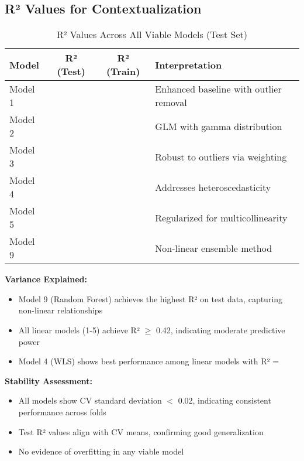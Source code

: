 \subsection{R² Values for Contextualization}

\begin{table}[h!]
\centering
\caption{R² Values Across All Viable Models (Test Set)}
\label{tab:r2_comparison}
\begin{tabular}{lccl}
\toprule
\textbf{Model} & \textbf{R² (Test)} & \textbf{R² (Train)} & \textbf{Interpretation} \\
\midrule
Model 1 & \ModelOneRSquaredTest{} & \ModelOneRSquaredTrain{} & Enhanced baseline with outlier removal \\
Model 2 & \ModelTwoRSquaredTest{} & \ModelTwoRSquaredTrain{} & GLM with gamma distribution \\
Model 3 & \ModelThreeRSquaredTest{} & \ModelThreeRSquaredTrain{} & Robust to outliers via weighting \\
Model 4 & \ModelFourRSquaredTest{} & \ModelFourRSquaredTrain{} & Addresses heteroscedasticity \\
Model 5 & \ModelFiveRSquaredTest{} & \ModelFiveRSquaredTrain{} & Regularized for multicollinearity \\
Model 9 & \ModelNineRSquaredTest{} & \ModelNineRSquaredTrain{} & Non-linear ensemble method \\
\bottomrule
\end{tabular}
\end{table}

\textbf{Variance Explained:}
\begin{itemize}
    \item Model 9 (Random Forest) achieves the highest R² on test data, capturing non-linear relationships
    \item All linear models (1-5) achieve R² $\geq$ 0.42, indicating moderate predictive power
    \item Model 4 (WLS) shows best performance among linear models with R² = \ModelFourRSquaredTest{}
\end{itemize}


\textbf{Stability Assessment:}
\begin{itemize}
    \item All models show CV standard deviation $<$ 0.02, indicating consistent performance across folds
    \item Test R² values align with CV means, confirming good generalization
    \item No evidence of overfitting in any viable model
\end{itemize}

